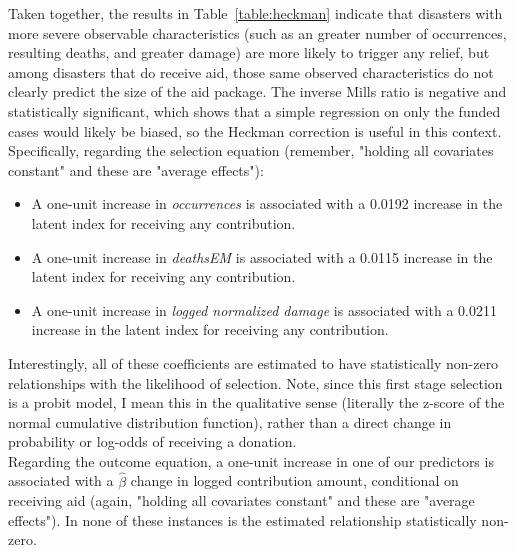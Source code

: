 \documentclass[12pt,letterpaper]{article}
\begin{document}
	\noindent Taken together, the results in Table~\ref{table:heckman} indicate that disasters with more severe observable characteristics (such as an greater number of occurrences, resulting deaths, and greater damage) are more likely to trigger any relief, but among disasters that do receive aid, those same observed characteristics do not clearly predict the size of the aid package. The  inverse Mills ratio is negative and statistically significant, which shows that a simple regression on only the funded cases would likely be biased, so the Heckman correction is useful in this context.\\
		
	\noindent Specifically, regarding the selection equation (remember, "holding all covariates constant" and these are "average effects"):
	\begin{itemize}
		\item A one-unit increase in \textit{occurrences} is associated with a 0.0192 increase in the latent index for receiving any contribution.
		\item A one-unit increase in \textit{deathsEM} is associated with a 0.0115 increase in the latent index for receiving any contribution.
		\item A one-unit increase in \textit{logged normalized damage} is associated with a 0.0211 increase in the latent index for receiving any contribution.
	\end{itemize}

	\noindent Interestingly, all of these coefficients are estimated to have statistically non-zero relationships with the likelihood of selection. Note, since this first stage selection is a probit model, I mean this in the qualitative sense (literally the z-score of the normal cumulative distribution function), rather than a direct change in probability or log-odds of receiving a donation.\\
	
	\noindent Regarding the outcome equation, a one-unit increase in one of our predictors is associated with a $\hat{\beta}$ change in logged contribution amount, conditional on receiving aid (again, "holding all covariates constant" and these are "average effects"). In none of these instances is the estimated relationship statistically non-zero.
	
\end{document}
